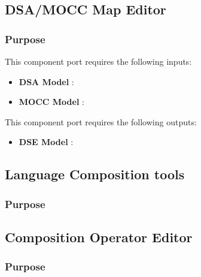 \documentclass{gemoc} %
\begin{document}
\subsection{DSA/MOCC Map Editor}


\subsubsection{Purpose}

This component port requires the following inputs:
\begin{itemize}
  \item \textbf{DSA Model} :
  \item \textbf{MOCC Model} :
\end{itemize}

This component port requires the following outputs:
\begin{itemize}
  \item \textbf{DSE Model} :
\end{itemize}

\subsection{Language Composition tools}


\subsubsection{Purpose}



\subsection{Composition Operator Editor}


\subsubsection{Purpose}
\end{document}
